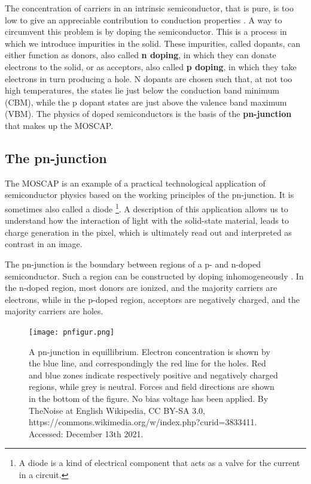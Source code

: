 \documentclass[../main.tex]{subfiles}
\begin{document}
	The concentration of carriers in an intrinsic semiconductor, that is pure, is too low to give an appreciable contribution to conduction properties \cite{solidstatephysicsbook}. A way to circumvent this problem is by doping the semiconductor. This is a process in which we introduce impurities in the solid. These impurities, called dopants, can either function as donors, also called \textbf{n doping}, in which they can donate electrons to the solid, or as acceptors, also called \textbf{p doping}, in which they take electrons in turn producing a hole. N dopants are chosen such that, at not too high temperatures, the states lie just below the conduction band minimum (CBM), while the p dopant states are just above the valence band maximum (VBM). The physics of doped semiconductors is the basis of the \textbf{pn-junction} that makes up the MOSCAP.
	
	\subsection{The pn-junction} 
	The MOSCAP is an example of a practical technological application of semiconductor physics based on the working principles of the pn-junction. It is sometimes also called a diode \footnote{A diode is a kind of electrical component that acts as a valve for the current in a circuit.}. A description of this application allows us to understand how the interaction of light with the solid-state material, leads to charge generation in the pixel, which is ultimately read out and interpreted as contrast in an image. 
	
	The pn-junction is the boundary between regions of a p- and n-doped semiconductor. Such a region can be constructed by doping inhomogeneously \cite{solidstatephysicsbook}. In the n-doped region, most donors are ionized, and the majority carriers are electrons, while in the p-doped region, acceptors are negatively charged, and the majority carriers are holes. 
	\begin{figure}[h!]
		\centering
		\texttt{[image: pnfigur.png]}
		\caption{ A pn-junction in equillibrium. Electron concentration is shown by the blue line, and correspondingly the red line for the holes. Red and blue zones indicate respectively positive and negatively charged regions, while grey is neutral. Forces and field directions are shown in the bottom of the figure. No bias voltage has been applied.
		By TheNoise at English Wikipedia, CC BY-SA 3.0, https://commons.wikimedia.org/w/index.php?curid=3833411.
		Accessed: December 13th 2021.
		}
		\label{fig:pnjunc}
	\end{figure}
	
\end{document}
